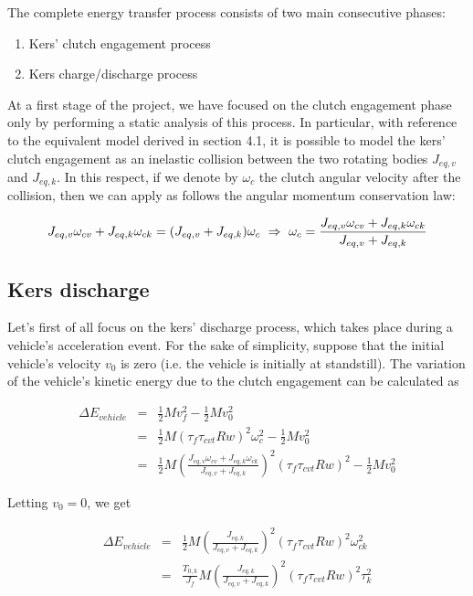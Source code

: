 \documentclass[11pt]{article}
\begin{document}
The complete energy transfer process consists of two main consecutive phases:

\begin{enumerate}
\item Kers' clutch engagement process
\item Kers charge/discharge process
\end{enumerate}

At a first stage of the project, we have focused on the clutch engagement phase only by performing a static analysis of this process. In particular, with reference to the equivalent model derived in section 4.1, it is possible to model the kers' clutch engagement as an inelastic collision between the two rotating bodies $J_{eq,v}$ and $J_{eq,k}$. In this respect, if we denote by $\omega_c$ the clutch angular velocity after the collision, then we can apply as follows the angular momentum conservation law:

\begin{equation}
J_{eq,v}\omega_{cv}+J_{eq,k}\omega_{ck}=(J_{eq,v}+J_{eq,k})\omega_c\ \Rightarrow\ \omega_c= \frac{J_{eq,v}\omega_{cv}+J_{eq,k}\omega_{ck}}{J_{eq,v}+J_{eq,k}}\\
\end{equation}  

\subsection{Kers discharge}

Let's first of all focus on the kers' discharge process, which takes place during a vehicle's acceleration event. For the sake of simplicity, suppose that the initial vehicle's velocity $v_0$ is zero (i.e. the vehicle is initially at standstill). The variation of the vehicle's kinetic energy due to the clutch engagement can be calculated as

\begin{eqnarray}
	\Delta E_{vehicle}&=&\frac{1}{2}Mv_f^2-\frac{1}{2}Mv_0^2\\
	                  &=&\frac{1}{2}M(\tau_f \tau_{cvt}Rw)^2\omega_c^2-\frac{1}							  {2}Mv_0^2\\
	                  &=&\frac{1}{2}M\left(\frac{J_{eq,v}\omega_{cv}+J_{eq,k}       					  \omega_{ck}}{J_{eq,v}+J_{eq,k}}\right)^2(\tau_f \tau_{cvt}						  Rw)^2-\frac{1}{2}Mv_0^2
\end{eqnarray}  

Letting $v_0=0$, we get

\begin{eqnarray}
\Delta E_{vehicle}&=&\frac{1}{2}M\left(\frac{J_{eq,k}}{J_{eq,v}+J_{eq,k}}								 \right)^2(\tau_f \tau_{cvt}Rw)^2\omega_{ck}^2\\
                  &=&\frac{T_{0,k}}{J_f}M\left(\frac{J_{eq,k}}{J_{eq,v}+J_{eq,k}}					     \right)^2(\tau_f \tau_{cvt}Rw)^2 \tau_k^2
\end{eqnarray}
\end{document}
